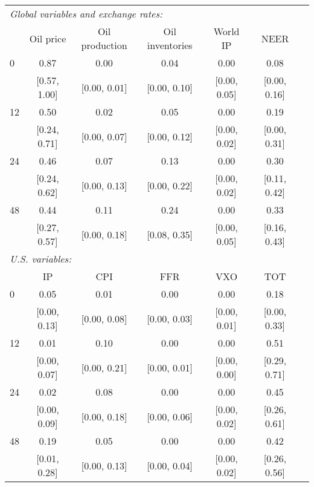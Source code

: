 \begin{tabular}{lcccccc}\toprule\midrule  
\multicolumn{6}{l}{\textit{Global variables and exchange rates:}} \\ 
 & Oil price & Oil production & Oil inventories & World IP & NEER  \\ \midrule  
 0 &     0.87 &     0.00 &     0.04 &     0.00 &     0.08  \\  
 & [0.57,    1.00] & [0.00,    0.01] & [0.00,    0.10] & [0.00,    0.05] & [0.00,    0.16] \\  
 12 &     0.50 &     0.02 &     0.05 &     0.00 &     0.19  \\  
 & [0.24,    0.71] & [0.00,    0.07] & [0.00,    0.12] & [0.00,    0.02] & [0.00,    0.31] \\  
 24 &     0.46 &     0.07 &     0.13 &     0.00 &     0.30  \\  
 & [0.24,    0.62] & [0.00,    0.13] & [0.00,    0.22] & [0.00,    0.02] & [0.11,    0.42] \\  
 48 &     0.44 &     0.11 &     0.24 &     0.00 &     0.33  \\  
 & [0.27,    0.57] & [0.00,    0.18] & [0.08,    0.35] & [0.00,    0.05] & [0.16,    0.43] \\[2ex] \midrule  
\multicolumn{6}{l}{\textit{U.S. variables:}} \\ 
 & IP & CPI & FFR & VXO & TOT  \\ \midrule  
 0 &     0.05 &     0.01 &     0.00 &     0.00 &     0.18  \\  
 & [0.00,    0.13] & [0.00,    0.08] & [0.00,    0.03] & [0.00,    0.01] & [0.00,    0.33] \\  
 12 &     0.01 &     0.10 &     0.00 &     0.00 &     0.51  \\  
 & [0.00,    0.07] & [0.00,    0.21] & [0.00,    0.01] & [0.00,    0.00] & [0.29,    0.71] \\  
 24 &     0.02 &     0.08 &     0.00 &     0.00 &     0.45  \\  
 & [0.00,    0.09] & [0.00,    0.18] & [0.00,    0.06] & [0.00,    0.02] & [0.26,    0.61] \\  
 48 &     0.19 &     0.05 &     0.00 &     0.00 &     0.42  \\  
 & [0.01,    0.28] & [0.00,    0.13] & [0.00,    0.04] & [0.00,    0.02] & [0.26,    0.56] \\  
\midrule\bottomrule 
\end{tabular}
